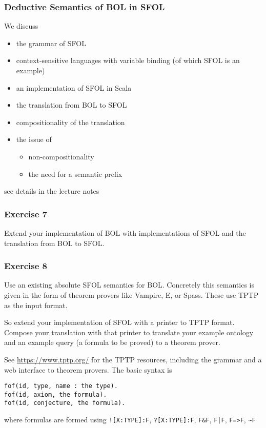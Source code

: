\begin{frame}\frametitle{Deductive Semantics of BOL in SFOL}
We discuss
\begin{itemize}
\item the grammar of SFOL
\item context-sensitive languages with variable binding (of which SFOL is an example)
\item an implementation of SFOL in Scala
\item the translation from BOL to SFOL
\item compositionality of the translation
\item the issue of
 \begin{itemize}
 \item non-compositionality
 \item the need for a semantic prefix
 \end{itemize}
\end{itemize}
see details in the lecture notes
\end{frame}

\begin{frame}\frametitle{Exercise 7}
Extend your implementation of BOL with implementations of SFOL and the translation from BOL to SFOL.
\end{frame}

\begin{frame}[fragile]\frametitle{Exercise 8}
Use an existing absolute SFOL semantics for BOL.
Concretely this semantics is given in the form of theorem provers like Vampire, E, or Spass.
These use TPTP as the input format.

So extend your implementation of SFOL with a printer to TPTP format.
Compose your translation with that printer to translate your example ontology and an example query (a formula to be proved) to a theorem prover.

See \url{https://www.tptp.org/} for the TPTP resources, including the grammar and a web interface to theorem provers.
The basic syntax is
\begin{lstlisting}
fof(id, type, name : the type).
fof(id, axiom, the formula).
fof(id, conjecture, the formula).
\end{lstlisting}
where formulas are formed using \lstinline|![X:TYPE]:F|, \lstinline|?[X:TYPE]:F|, \lstinline|F&F|, \lstinline!F|F!, \lstinline|F=>F|, \lstinline|~F|
\end{frame}


